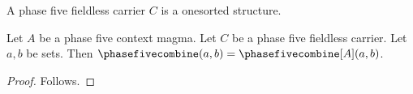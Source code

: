 

\begin{struct}\label{phase5_fieldless_carrier}
    A phase five fieldless carrier $C$ is a onesorted structure.
\end{struct}

\begin{proposition}\label{phase5_structure_receiver_filtered}
    Let $A$ be a phase five context magma.
    Let $C$ be a phase five fieldless carrier.
    Let $a,b$ be sets.
    Then $\phasefivecombine(a,b)=\phasefivecombine[A](a,b)$.
\end{proposition}
\begin{proof}
    Follows.
\end{proof}
